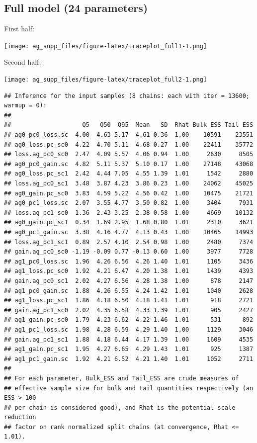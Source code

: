 \documentclass[
]{article}
\begin{document}
\hypertarget{full-model-24-parameters}{%
\subsection{Full model (24 parameters)}\label{full-model-24-parameters}}

First half:

\texttt{[image: ag\_supp\_files/figure-latex/traceplot\_full1-1.png]}

Second half:

\texttt{[image: ag\_supp\_files/figure-latex/traceplot\_full2-1.png]}

\begin{verbatim}
## Inference for the input samples (8 chains: each with iter = 13600; warmup = 0):
## 
##                    Q5   Q50  Q95  Mean   SD  Rhat Bulk_ESS Tail_ESS
## ag0_pc0_loss.sc  4.00  4.63 5.17  4.61 0.36  1.00    10591    23551
## ag0_loss.pc_sc0  4.22  4.70 5.11  4.68 0.27  1.00    22411    35772
## loss.ag_pc0_sc0  2.47  4.09 5.57  4.06 0.94  1.00     2630     8505
## ag0_pc0_gain.sc  4.82  5.11 5.37  5.10 0.17  1.00    27148    43068
## ag0_loss.pc_sc1  2.42  4.44 7.05  4.55 1.39  1.01     1542     2880
## loss.ag_pc0_sc1  3.48  3.87 4.23  3.86 0.23  1.00    24062    45025
## ag0_gain.pc_sc0  3.83  4.59 5.22  4.56 0.42  1.00    10475    21721
## ag0_pc1_loss.sc  2.07  3.55 4.77  3.50 0.82  1.00     3404     7931
## loss.ag_pc1_sc0  1.36  2.43 3.25  2.38 0.58  1.00     4669    10132
## ag0_gain.pc_sc1  0.34  1.69 2.95  1.68 0.80  1.01     2310     3621
## ag0_pc1_gain.sc  3.38  4.16 4.77  4.13 0.43  1.00    10465    14993
## loss.ag_pc1_sc1  0.89  2.57 4.10  2.54 0.98  1.00     2480     7374
## gain.ag_pc0_sc0 -1.19 -0.09 0.77 -0.13 0.60  1.00     3977     7728
## ag1_pc0_loss.sc  1.96  4.26 6.56  4.26 1.40  1.01     1105     3436
## ag1_loss.pc_sc0  1.92  4.21 6.47  4.20 1.38  1.01     1439     4393
## gain.ag_pc0_sc1  2.02  4.27 6.56  4.28 1.38  1.00      878     2147
## ag1_pc0_gain.sc  1.88  4.26 6.55  4.24 1.42  1.01     1040     2628
## ag1_loss.pc_sc1  1.86  4.18 6.50  4.18 1.41  1.01      918     2721
## gain.ag_pc1_sc0  2.02  4.35 6.58  4.33 1.39  1.01      905     2427
## ag1_gain.pc_sc0  1.79  4.23 6.62  4.22 1.46  1.01      531      892
## ag1_pc1_loss.sc  1.98  4.28 6.59  4.29 1.40  1.00     1129     3046
## gain.ag_pc1_sc1  1.88  4.18 6.44  4.17 1.39  1.00     1609     4535
## ag1_gain.pc_sc1  1.95  4.27 6.65  4.29 1.43  1.01      925     1387
## ag1_pc1_gain.sc  1.92  4.21 6.52  4.21 1.40  1.01     1052     2711
## 
## For each parameter, Bulk_ESS and Tail_ESS are crude measures of 
## effective sample size for bulk and tail quantities respectively (an ESS > 100 
## per chain is considered good), and Rhat is the potential scale reduction 
## factor on rank normalized split chains (at convergence, Rhat <= 1.01).
\end{verbatim}
\end{document}
